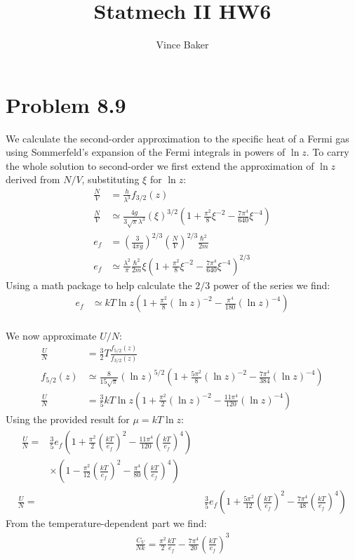 \documentclass[a4paper,11pt]{article}
\title{Statmech II HW6}
\author{Vince Baker}
\numberwithin{equation}{section}
\begin{document}
\maketitle

\section{Problem 8.9}
We calculate the second-order approximation to the specific heat of a Fermi gas using Sommerfeld's expansion of the Fermi integrals in powers of $\ln{z}$.
To carry the whole solution to second-order we first extend the approximation of $\ln{z}$ derived from $N/V$, substituting $\xi$ for $\ln{z}$:
\begin{align}
 \frac{N}{V} &= \frac{h}{\lambda^3}f_{3/2}(z)\\
 \frac{N}{V} &\simeq \frac{4g}{3\sqrt{\pi}\lambda^3}(\xi)^{3/2}\left(1+\frac{\pi^2}{8}\xi^{-2}-\frac{7\pi^4}{640}\xi^{-4} \right)\\
 e_f &= \left(\frac{3}{4\pi g} \right)^{2/3}\left(\frac{N}{V} \right)^{2/3}\frac{\hbar^2}{2m}\\
 e_f &\simeq \frac{\lambda^2}{\pi}\frac{\hbar^2}{2m}\xi\left(1+\frac{\pi^2}{8}\xi^{-2}-\frac{7\pi^4}{640}\xi^{-4} \right)^{2/3}
\end{align}
Using a math package to help calculate the $2/3$ power of the series we find:
\begin{align}
 e_f &\simeq kT\ln{z}\left(1+\frac{\pi^2}{8}(\ln{z})^{-2}-\frac{\pi^4}{180}(\ln{z})^{-4} \right)
\end{align}
\\
We now approximate $U/N$:
\begin{align}
 \frac{U}{N} &= \frac{3}{2}T\frac{f_{5/2}(z)}{f_{3/2}(z)}\\
 f_{5/2}(z) &\simeq \frac{8}{15\sqrt{\pi}}(\ln{z})^{5/2}\left(1+\frac{5\pi^2}{8}(\ln{z})^{-2}-\frac{7\pi^4}{384}(\ln{z})^{-4} \right)\\
 \frac{U}{N} &= \frac{3}{5}kT\ln{z}\left(1+\frac{\pi^2}{2}(\ln{z})^{-2}-\frac{11\pi^4}{120}(\ln{z})^{-4} \right)
\end{align}
Using the provided result for $\mu=kT\ln{z}$:
\begin{align}
\begin{split}
 \frac{U}{N} = &\frac{3}{5}e_f\left(1+\frac{\pi^2}{2}(\frac{kT}{e_f})^2-\frac{11\pi^4}{120}(\frac{kT}{e_f})^4 \right)\\
	       &\times\left(1-\frac{\pi^2}{12}(\frac{kT}{e_f})^2-\frac{\pi^4}{80}(\frac{kT}{e_f})^4 \right)
\end{split}\\
\frac{U}{N} = &\frac{3}{5}e_f\left(1+\frac{5\pi^2}{12}(\frac{kT}{e_f})^2-\frac{7\pi^4}{48}(\frac{kT}{e_f})^4 \right)
\end{align}
From the temperature-dependent part we find:
\begin{align}
 \frac{C_V}{Nk} = \frac{\pi^2}{2}\frac{kT}{e_f}-\frac{7\pi^4}{20}\left(\frac{kT}{e_f}\right)^3
\end{align}
\end{document}

